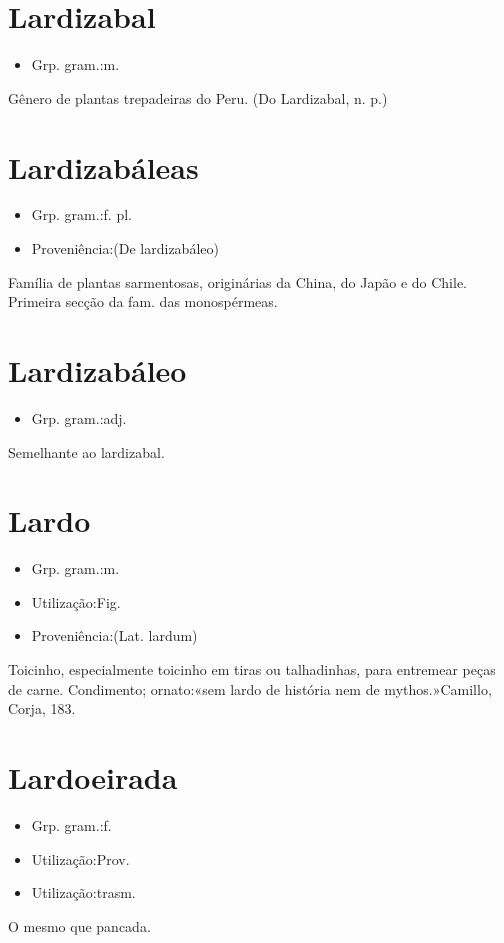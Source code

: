 \section{Lardizabal}
\begin{itemize}
\item {Grp. gram.:m.}
\end{itemize}
Gênero de plantas trepadeiras do Peru.
(Do \textunderscore Lardizabal\textunderscore , n. p.)
\section{Lardizabáleas}
\begin{itemize}
\item {Grp. gram.:f. pl.}
\end{itemize}
\begin{itemize}
\item {Proveniência:(De \textunderscore lardizabáleo\textunderscore )}
\end{itemize}
Família de plantas sarmentosas, originárias da China, do Japão e do Chile.
Primeira secção da fam. das monospérmeas.
\section{Lardizabáleo}
\begin{itemize}
\item {Grp. gram.:adj.}
\end{itemize}
Semelhante ao lardizabal.
\section{Lardo}
\begin{itemize}
\item {Grp. gram.:m.}
\end{itemize}
\begin{itemize}
\item {Utilização:Fig.}
\end{itemize}
\begin{itemize}
\item {Proveniência:(Lat. \textunderscore lardum\textunderscore )}
\end{itemize}
Toicinho, especialmente toicinho em tiras ou talhadinhas, para entremear peças de carne.
Condimento; ornato:«\textunderscore sem lardo de história nem de mythos.\textunderscore »Camillo, \textunderscore Corja\textunderscore , 183.
\section{Lardoeirada}
\begin{itemize}
\item {Grp. gram.:f.}
\end{itemize}
\begin{itemize}
\item {Utilização:Prov.}
\end{itemize}
\begin{itemize}
\item {Utilização:trasm.}
\end{itemize}
O mesmo que \textunderscore pancada\textunderscore .

